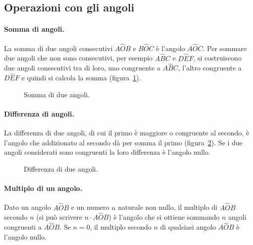 \subsection{Operazioni con gli angoli}

\paragraph{Somma di angoli.} La somma di due angoli consecutivi 
$A\widehat{O}B$ e $B\widehat{O}C$ è l'angolo $A\widehat{O}C$. Per 
sommare due angoli che non sono consecutivi, per esempio 
$A\widehat{B}C$ e $D\widehat{E}F$, si costruiscono due angoli 
consecutivi tra di loro, uno congruente a $A\widehat{B}C$, l'altro 
congruente a $D\widehat{E}F$ e quindi si calcola la somma 
(figura~\ref{fig:1.32}).


\begin{inaccessibleblock}
 \begin{figure}[htb]
\centering
\caption{Somma di due angoli.}\label{fig:1.32}
\end{figure}
\end{inaccessibleblock}

\paragraph{Differenza di angoli.} La differenza di due angoli, di cui 
il primo è maggiore o congruente al secondo, è l'angolo che 
addizionato al secondo dà per somma il primo (figura~\ref{fig:1.33}). 
Se i due angoli considerati sono congruenti la loro differenza è 
l'angolo nullo.


\begin{inaccessibleblock}
 \begin{figure}[htb]
\centering
\caption{Differenza di due angoli.}\label{fig:1.33}
\end{figure}
\end{inaccessibleblock}

\paragraph{Multiplo di un angolo.} Dato un angolo $A\widehat{O}B$ e 
un numero $n$ naturale non nullo, il multiplo di $A\widehat{O}B$ 
secondo $n$ (si può scrivere $n\cdot A\widehat{O}B$) è l'angolo che 
si ottiene sommando $n$ angoli congruenti a $A\widehat{O}B$. Se 
$n=0$, il multiplo secondo $n$ di qualsiasi angolo $A\widehat{O}B$ è 
l'angolo nullo.


